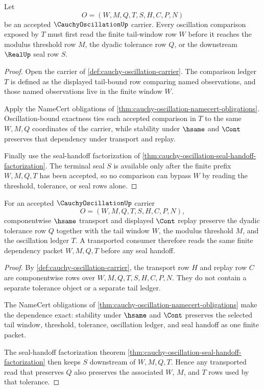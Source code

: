 \begin{theorem}
\label{thm:cauchy-oscillation-tail-window-exposure}
Let
$$
O=(W,M,Q,T,S,H,C,P,N)
$$
be an accepted $\CauchyOscillationUp$ carrier. Every oscillation comparison exposed by $T$ must first read the finite tail-window row $W$ before it reaches the modulus threshold row $M$, the dyadic tolerance row $Q$, or the downstream $\RealUp$ seal row $S$.
\end{theorem}
\begin{proof}
Open the carrier of \autoref{def:cauchy-oscillation-carrier}. The comparison ledger $T$ is defined as the displayed tail-bound row comparing named observations, and those named observations live in the finite window $W$.

Apply the NameCert obligations of \autoref{thm:cauchy-oscillation-namecert-obligations}. Oscillation-bound exactness ties each accepted comparison in $T$ to the same $W,M,Q$ coordinates of the carrier, while stability under $\hsame$ and $\Cont$ preserves that dependency under transport and replay.

Finally use the seal-handoff factorization of \autoref{thm:cauchy-oscillation-seal-handoff-factorization}. The terminal seal $S$ is available only after the finite prefix $W,M,Q,T$ has been accepted, so no comparison can bypass $W$ by reading the threshold, tolerance, or seal rows alone.
\end{proof}

\begin{theorem}
\label{thm:cauchy-oscillation-dyadic-tolerance-stability}
For an accepted $\CauchyOscillationUp$ carrier
$$
O=(W,M,Q,T,S,H,C,P,N),
$$
componentwise $\hsame$ transport and displayed $\Cont$ replay preserve the dyadic tolerance row $Q$ together with the tail window $W$, the modulus threshold $M$, and the oscillation ledger $T$. A transported consumer therefore reads the same finite dependency packet $W,M,Q,T$ before any seal handoff.
\end{theorem}
\begin{proof}
By \autoref{def:cauchy-oscillation-carrier}, the transport row $H$ and replay row $C$ are componentwise rows over $W,M,Q,T,S,H,C,P,N$. They do not contain a separate tolerance object or a separate tail ledger.

The NameCert obligations of \autoref{thm:cauchy-oscillation-namecert-obligations} make the dependence exact: stability under $\hsame$ and $\Cont$ preserves the selected tail window, threshold, tolerance, oscillation ledger, and seal handoff as one finite packet.

The seal-handoff factorization theorem \autoref{thm:cauchy-oscillation-seal-handoff-factorization} then keeps $S$ downstream of $W,M,Q,T$. Hence any transported read that preserves $Q$ also preserves the associated $W$, $M$, and $T$ rows used by that tolerance.
\end{proof}

